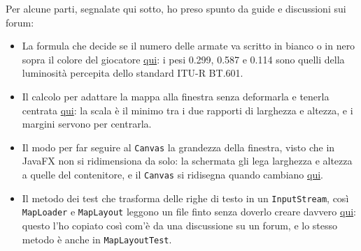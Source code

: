 \documentclass[a4paper,12pt]{report}
\begin{document}
Per alcune parti, segnalate qui sotto, ho preso spunto da guide e discussioni sui forum:
\begin{itemize}
    \item La formula che decide se il numero delle armate va scritto in bianco o in nero sopra il colore del giocatore \href{https://github.com/MoneIsProgrammer/risiko/blob/90268fcf19c4a90738d5f2d6c9d17ea0389a93c0/src/main/java/it/unibo/risiko/view/map/MapCanvas.java#L303-L308}{qui}: i pesi 0.299, 0.587 e 0.114 sono quelli della luminosità percepita dello standard ITU-R BT.601.
    \item Il calcolo per adattare la mappa alla finestra senza deformarla e tenerla centrata \href{https://github.com/MoneIsProgrammer/risiko/blob/90268fcf19c4a90738d5f2d6c9d17ea0389a93c0/src/main/java/it/unibo/risiko/view/map/ViewTransform.java#L22-L28}{qui}: la scala è il minimo tra i due rapporti di larghezza e altezza, e i margini servono per centrarla.
    \item Il modo per far seguire al \texttt{Canvas} la grandezza della finestra, visto che in JavaFX non si ridimensiona da solo: la schermata gli lega larghezza e altezza a quelle del contenitore, e il \texttt{Canvas} si ridisegna quando cambiano \href{https://github.com/MoneIsProgrammer/risiko/blob/90268fcf19c4a90738d5f2d6c9d17ea0389a93c0/src/main/java/it/unibo/risiko/view/map/MapCanvas.java#L93-L94}{qui}.
    \item Il metodo dei test che trasforma delle righe di testo in un \texttt{InputStream}, così \texttt{MapLoader} e \texttt{MapLayout} leggono un file finto senza doverlo creare davvero \href{https://github.com/MoneIsProgrammer/risiko/blob/90268fcf19c4a90738d5f2d6c9d17ea0389a93c0/src/test/java/it/unibo/risiko/model/map/MapLoaderTest.java#L60-L62}{qui}: questo l'ho copiato così com'è da una discussione su un forum, e lo stesso metodo è anche in \texttt{MapLayoutTest}.
\end{itemize}
\end{document}
